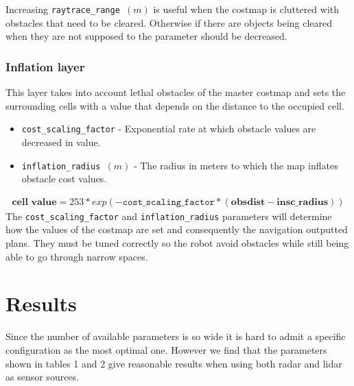 \documentclass[12pt]{article}
\begin{document}
Increasing \texttt{raytrace\_range $(m)$} is useful when the costmap is cluttered with obstacles that need to be cleared. Otherwise if there are objects being cleared when they are not supposed to the parameter should be decreased.
\subsubsection{Inflation layer}
This layer takes into account lethal obstacles of the master costmap and sets the surrounding cells with a value that depends on the distance to the occupied cell.
\begin{itemize}[label={}]
    \item \texttt{cost\_scaling\_factor} - Exponential rate at which obstacle values are decreased in value.
    \item \texttt{inflation\_radius $(m)$} - The radius in meters to which the map inflates obstacle cost values.
\end{itemize}
\begin{align*}
    \textbf{cell value}=253*exp(-\texttt{cost\_scaling\_factor} * (\textbf{obsdist} - \textbf{insc\_radius}))
\end{align*}
The \texttt{cost\_scaling\_factor} and \texttt{inflation\_radius} parameters will determine how the values of the costmap are set and consequently  the navigation outputted plans. They must be tuned correctly so the robot avoid obstacles while still being able to go through narrow spaces.  


\section{Results}
Since the number of available parameters is so wide it is hard to admit a specific configuration as the most optimal one. However we find that the parameters shown in tables 1 and 2 give reasonable results when using both radar and lidar as sensor sources. 
\end{document}
